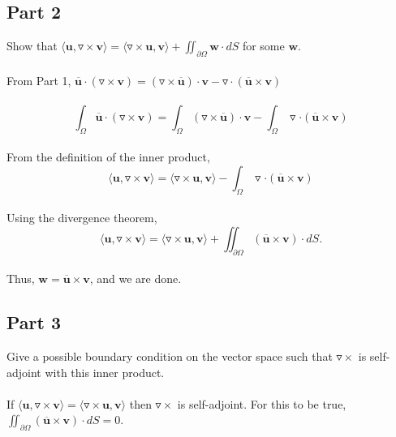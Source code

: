 \documentclass{amsart}
\begin{document}
	\subsection{Part 2}
	Show that $\langle\mathbf{u},\triangledown \times \mathbf{v}\rangle = \langle\triangledown \times \mathbf{u},\mathbf{v}\rangle + \iint_{\partial \Omega} 
	\mathbf{w} \cdot dS$ for some $\mathbf{w}$.
	\\\\
	From Part 1, $\overline{\mathbf{u}} \cdot (\triangledown \times \mathbf{v}) = (\triangledown \times \overline{\mathbf{u}}) \cdot \mathbf{v} - \triangledown \cdot (\overline{\mathbf{u}} \times \mathbf{v})$
	\\\\
	\[ \int_{\Omega}\overline{\mathbf{u}} \cdot (\triangledown \times \mathbf{v}) = \int_{\Omega}(\triangledown \times \overline{\mathbf{u}}) \cdot \mathbf{v} - \int_{\Omega} \triangledown \cdot (\overline{\mathbf{u}} \times \mathbf{v})
	\]\\
	From the definition of the inner product,
	\\
	\[\langle\mathbf{u},\triangledown \times \mathbf{v}\rangle = \langle\triangledown \times \mathbf{u},\mathbf{v}\rangle - \int_{\Omega} \triangledown \cdot (\overline{\mathbf{u}} \times \mathbf{v})
	\]\\
	Using the divergence theorem,
	\\
	\[\langle\mathbf{u},\triangledown \times \mathbf{v}\rangle = \langle\triangledown \times \mathbf{u},\mathbf{v}\rangle + \iint_{\partial \Omega} (\overline{\mathbf{u}} \times \mathbf{v}) \cdot dS.
	\]
	\\
	Thus, $\mathbf{w} = \overline{\mathbf{u}} \times \mathbf{v}$, and we are done.
	\\
	\subsection{Part 3}
	Give a possible boundary condition on the vector space such that $\triangledown\times$ is self-adjoint with this inner product.
	\\\\
	If $\langle \mathbf{u} ,\triangledown\times \mathbf{v} \rangle = \langle \triangledown\times \mathbf{u}, \mathbf{v} \rangle$ then $\triangledown\times$ is self-adjoint. For this to be true,\\ $\iint_{\partial\Omega} (\overline{\mathbf{u}}\times \mathbf{v})\cdot dS = 0$.
	\\
	
\end{document}
